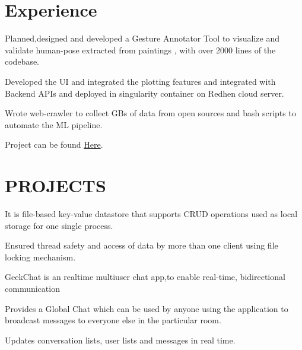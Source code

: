 \documentclass[]{deedy-resume-openfont}
\begin{document}
\begin{minipage}[t]{0.66\textwidth} 


\section{Experience}

\vspace{\topsep} %
\begin{tightemize}\item Planned,designed and developed a Gesture Annotator Tool to visualize and
validate human-pose extracted from  paintings , with over 2000 lines of the codebase.
\item Developed the UI and integrated the plotting features and integrated with Backend APIs and deployed in singularity container on Redhen cloud server.
\item Wrote web-crawler to collect GBs of data from open sources and bash scripts
to automate the ML pipeline.
\item Project can be found  \href{https://summerofcode.withgoogle.com/archive/2019/projects/5565179075493888/}{Here}.
\end{tightemize}
\sectionsep

\sectionsep


\section{PROJECTS}

\begin{tightemize}
\item It is file-based key-value datastore that supports  CRUD operations used as local storage for one single process.
\item Ensured thread safety and access of data by more than one client using file locking mechanism.
\end{tightemize}
\sectionsep

GeekChat is an realtime multiuser chat app,to enable real-time, bidirectional communication
\begin{tightemize}
\item Provides a Global Chat which can be used by anyone using the application to
broadcast messages to everyone else in the particular room.
\item Updates conversation lists, user lists and messages in real time.
\end{tightemize}
\sectionsep


\end{minipage}
\end{document}
